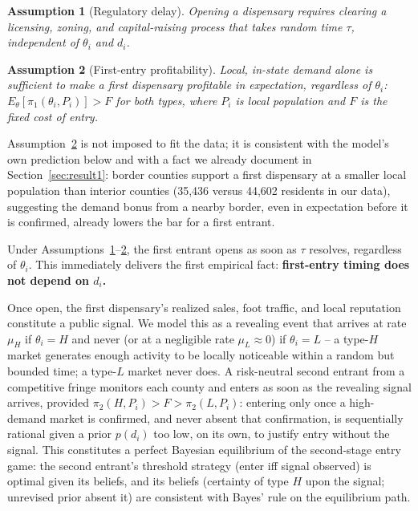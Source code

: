 \documentclass[12pt]{article}
\newtheorem{assumption}{Assumption}
\begin{document}
\begin{assumption}[Regulatory delay]
\label{as:delay}
Opening a dispensary requires clearing a licensing, zoning, and capital-raising process that takes random
time $\tau$, independent of $\theta_i$ and $d_i$.
\end{assumption}

\begin{assumption}[First-entry profitability]
\label{as:first}
Local, in-state demand alone is sufficient to make a first dispensary profitable in expectation, regardless
of $\theta_i$: $E_{\theta}[\pi_1(\theta_i, P_i)] > F$ for both types, where $P_i$ is local population and $F$
is the fixed cost of entry.
\end{assumption}

Assumption~\ref{as:first} is not imposed to fit the data; it is consistent with the model's own prediction
below and with a fact we already document in Section~\ref{sec:result1}: border counties support a first
dispensary at a smaller local population than interior counties (35,436 versus 44,602 residents in our data),
suggesting the demand bonus from a nearby border, even in expectation before it is confirmed, already lowers
the bar for a first entrant.

Under Assumptions~\ref{as:delay}--\ref{as:first}, the first entrant opens as soon as $\tau$ resolves,
regardless of $\theta_i$. This immediately delivers the first empirical fact: \textbf{first-entry timing does
not depend on $d_i$.}

Once open, the first dispensary's realized sales, foot traffic, and local reputation constitute a public
signal. We model this as a revealing event that arrives at rate $\mu_H$ if $\theta_i = H$ and never (or at a
negligible rate $\mu_L \approx 0$) if $\theta_i = L$ -- a type-$H$ market generates enough activity to be
locally noticeable within a random but bounded time; a type-$L$ market never does. A risk-neutral second
entrant from a competitive fringe monitors each county and enters as soon as the revealing signal arrives,
provided $\pi_2(H, P_i) > F > \pi_2(L, P_i)$: entering only once a high-demand market is confirmed, and never
absent that confirmation, is sequentially rational given a prior $p(d_i)$ too low, on its own, to justify
entry without the signal. This constitutes a perfect Bayesian equilibrium of the second-stage entry game: the
second entrant's threshold strategy (enter iff signal observed) is optimal given its beliefs, and its beliefs
(certainty of type $H$ upon the signal; unrevised prior absent it) are consistent with Bayes' rule on the
equilibrium path.
\end{document}
